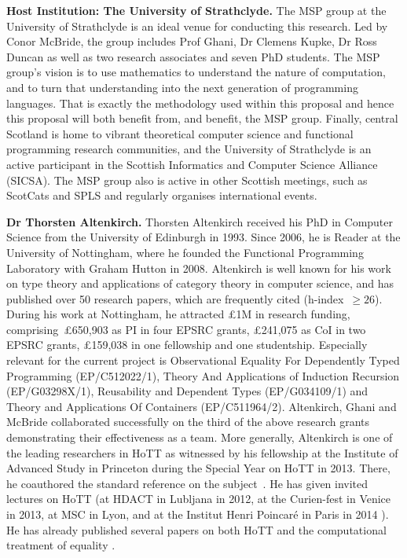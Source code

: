 \documentclass[a4paper,11pt]{article}
\begin{document}
\textbf{Host Institution: The University of Strathclyde.} The MSP
group at the University of Strathclyde is an ideal venue for
conducting this research. Led by Conor McBride, the group includes
Prof Ghani, Dr Clemens Kupke, Dr Ross Duncan as well as two research
associates and seven PhD students. The MSP group's vision is to use
mathematics to understand the nature of computation, and to turn that
understanding into the next generation of programming languages. That
is exactly the methodology used within this proposal and hence this
proposal will both benefit from, and benefit, the MSP group.
Finally, central Scotland is home to vibrant theoretical computer
science and functional programming research communities, and the
University of Strathclyde is an active participant in the Scottish
Informatics and Computer Science Alliance (SICSA). The MSP group also
is active in other Scottish meetings, such as ScotCats and SPLS and
regularly organises international events.

\newpage \textbf{Dr Thorsten Altenkirch.}  Thorsten Altenkirch
received his PhD in Computer Science from the University of Edinburgh
in 1993. Since 2006, he is Reader at the University of Nottingham,
where he founded the Functional Programming Laboratory with Graham
Hutton in 2008. Altenkirch is well known for his work on type theory
and applications of category theory in computer science, and has
published over 50 research papers, which are frequently cited
(h-index~$\geq 26$).  During his work at Nottingham, he attracted
\pounds 1M in research funding, comprising~\pounds650,903 as PI in
four EPSRC grants, \pounds241,075 as CoI in two EPSRC grants,
\pounds159,038 in one fellowship and one studentship. Especially
relevant for the current project is Observational Equality For
Dependently Typed Programming (EP/C512022/1), Theory And Applications
of Induction Recursion (EP/G03298X/1), Reusability and Dependent Types
(EP/G034109/1) and Theory and Applications Of Containers
(EP/C511964/2).  Altenkirch, Ghani and McBride collaborated
successfully on the third of the above research grants demonstrating their
effectiveness as a team. More generally, Altenkirch is
one of the leading researchers in HoTT as witnessed by his
fellowship at the Institute of Advanced Study in Princeton during the
Special Year on HoTT in 2013. There, he coauthored the standard
reference on the subject~\cite{hott-book}.  He has given invited
lectures on HoTT (at HDACT in Lubljana in 2012, at the Curien-fest in
Venice in 2013, at MSC in Lyon, and at the Institut Henri Poincar\'e
in Paris in 2014 \cite{txa-ihp14}). He has already published several
papers on both HoTT and the computational treatment of equality
\cite{altenkirch:extSetoids,alti:ott-conf,alti:csl12,alti:tlca13-hedberg}.
\end{document}

